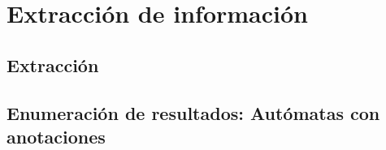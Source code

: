 \section{Extracción de información}

\subsection{Extracción}

\subsection{Enumeración de resultados: Autómatas con anotaciones}